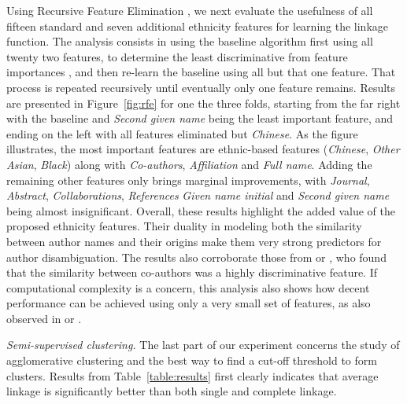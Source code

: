 \documentclass{article}
\begin{document}
Using Recursive Feature Elimination \cite{guyon2002gene}, we next evaluate the
usefulness of all fifteen standard and seven additional ethnicity features for learning
the linkage function. The analysis consists in using the baseline algorithm
first using all twenty two features, to determine the least discriminative from feature
importances \citep{louppe2013understanding}, and then re-learn the baseline
using all but that one feature. That process is repeated recursively until
eventually only one feature remains. Results are presented in
Figure~\ref{fig:rfe} for one the three folds, starting from the far right with
the baseline and \textit{Second given name} being the least important feature,
and ending on the left with all features eliminated but \textit{Chinese}. As
the figure illustrates, the most important features are ethnic-based features
(\textit{Chinese}, \textit{Other Asian}, \textit{Black}) along with
\textit{Co-authors}, \textit{Affiliation} and \textit{Full name}. Adding the remaining
other features only brings marginal improvements, with \textit{Journal},
\textit{Abstract}, \textit{Collaborations}, \textit{References} \textit{Given
name initial} and \textit{Second given name} being almost insignificant.
Overall, these results highlight the added value of the proposed ethnicity
features.
Their duality in modeling both the similarity between author names
and their origins make them very strong predictors for author disambiguation.
The results also corroborate those from \citep{kang2009co} or \citep{ferreira2010effective}, who
found that the similarity between co-authors was a highly discriminative
feature.
If computational complexity is a concern, this analysis also
shows how decent performance can be achieved using only a very
small set of features, as also observed in
\citep{treeratpituk2009disambiguating} or \citep{levin2012citation}.

\textit{Semi-supervised clustering.} The last part of our experiment concerns
the study of agglomerative clustering and the best way to find a cut-off
threshold to form clusters. Results from Table~\ref{table:results}
first clearly indicates that average linkage is significantly better than
both single and complete linkage.
\end{document}
